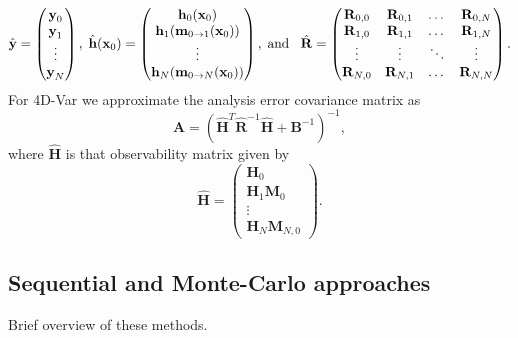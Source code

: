 \documentclass[12pt]{article}
\begin{document}
\begin{equation}
\hat{\textbf{y}} =
\begin{pmatrix}
\textbf{y}_0 \\
\textbf{y}_1\\
\vdots \\
\textbf{y}_N
\end{pmatrix},
\hspace{1mm}
\hat{\textbf{h}}(\textbf{x}_0)=
\begin{pmatrix}
\textbf{h}_0(\textbf{x}_0) \\
\textbf{h}_1(\textbf{m}_{0\rightarrow 1}(\mathbf{x}_{0}))\\
\vdots \\
\textbf{h}_N(\textbf{m}_{0\rightarrow N}(\mathbf{x}_{0}))
\end{pmatrix}, \\
\hspace{1mm} \text{and} \hspace{3mm}
\hat{\mathbf{R}} =
\begin{pmatrix}
\mathbf{R}_{0, 0} & \mathbf{R}_{0, 1} & \dots & \mathbf{R}_{0, N} \\
\mathbf{R}_{1, 0} & \mathbf{R}_{1, 1} & \dots & \mathbf{R}_{1, N} \\
\vdots & \vdots & \ddots & \vdots \\
\mathbf{R}_{N, 0} & \mathbf{R}_{N, 1} & \dots & \mathbf{R}_{N, N}
\end{pmatrix}.
\end{equation}
For 4D-Var we approximate the analysis error covariance matrix as
\begin{equation}
\textbf{A} = (\hat{\textbf{H}}^{T}\hat{\textbf{R}}^{-1}\hat{\textbf{H}}+\textbf{B}^{-1})^{-1}, \label{eqn:a_cov_4dvar}
\end{equation}
where \(\hat{\textbf{H}}\) is that observability matrix given by
\begin{equation}
\hat{\mathbf{H}}=
\begin{pmatrix}
\mathbf{H}_0 \\
\mathbf{H}_1\mathbf{M}_0\\
\vdots \\
\mathbf{H}_N\mathbf{M}_{N,0}
\end{pmatrix}.
\end{equation}
\subsection{Sequential and Monte-Carlo approaches}

Brief overview of these methods.
\end{document}
